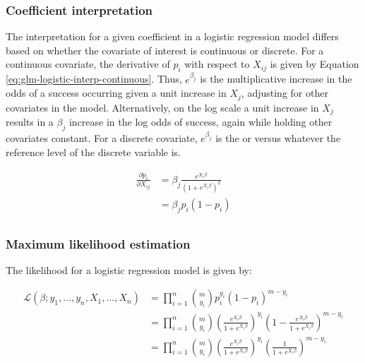 \documentclass{report}
\begin{document}
\subsubsection{Coefficient interpretation}

The interpretation for a given coefficient in a logistic regression model differs based on whether the covariate of interest is continuous or discrete. For a continuous covariate, the derivative of $p_i$ with respect to $X_{ij}$ is given by Equation \ref{eq:glm-logistic-interp-continuous}. Thus, $e^{\beta_j}$ is the multiplicative increase in the odds of a success occurring given a unit increase in $X_j$, adjusting for other covariates in the model. Alternatively, on the log scale a unit increase in $X_j$ results in a $\beta_j$ increase in the log odds of success, again while holding other covariates constant. For a discrete covariate, $e^{\beta_j}$ is the \gls{or} versus whatever the reference level of the discrete variable is. 

\begin{equation}\label{eq:glm-logistic-interp-continuous}
    \begin{aligned}
        \frac{\partial p_i}{\partial X_{ij}} 
          &= \beta_j \frac{e^{X_i\beta}}{\left(1 + e^{X_i\beta}\right)^2} \\
          &= \beta_j p_i (1 - p_i) \\
    \end{aligned}
\end{equation}

\subsubsection{Maximum likelihood estimation}

The likelihood for a logistic regression model is given by:

\begin{equation}\label{eq:glm-logistic-likelihood}
    \begin{aligned}
        \mathcal{L}(\beta; y_1, \dots, y_n, X_1, \dots, X_n) 
          &= \prod_{i=1}^n \binom{m}{y_i} p_i^{y_i}(1-p_i)^{m-y_i} \\
          &= \prod_{i=1}^n \binom{m}{y_i} \left(\frac{e^{X_i\beta}}{1 + e^{X_i\beta}}\right)^{y_i}\left(1-\frac{e^{X_i\beta}}{1 + e^{X_i\beta}}\right)^{m-y_i} \\
          &= \prod_{i=1}^n \binom{m}{y_i}\left(\frac{e^{X_i\beta}}{1 + e^{X_i\beta}}\right)^{y_i}\left(\frac{1}{1+e^{X_i\beta}}\right)^{m-y_i} \\ 
    \end{aligned}
\end{equation}
\end{document}
